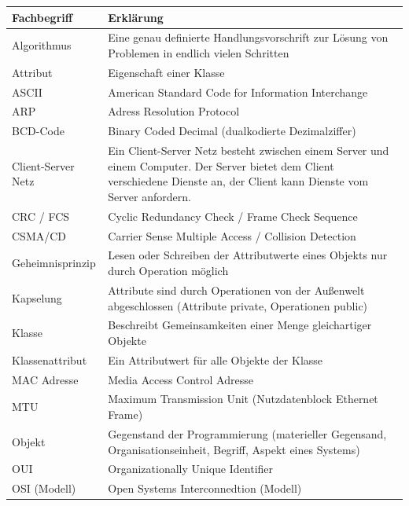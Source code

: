 \documentclass[12pt,a4paper]{article}
\begin{document}
    \begin{table}[h]
        \renewcommand{\arraystretch}{2}
        \begin{tabularx}{17cm}{|l|X|}
            \hline
            Fachbegriff&Erklärung\\
            \hline
            \hline
            Algorithmus&Eine genau definierte Handlungsvorschrift zur Lösung von Problemen in endlich vielen Schritten\\
            \hline
            Attribut&Eigenschaft einer Klasse\\
            \hline
            ASCII&American Standard Code for Information Interchange\\
            \hline
            ARP&Adress Resolution Protocol\\
            \hline
            BCD-Code&Binary Coded Decimal (dualkodierte Dezimalziffer)\\
            \hline
            Client-Server Netz&Ein Client-Server Netz besteht zwischen einem Server und einem Computer. Der Server bietet dem Client verschiedene Dienste an, der Client kann Dienste vom Server anfordern.\\
            \hline
            CRC / FCS& Cyclic Redundancy Check / Frame Check Sequence\\
            \hline
            CSMA/CD&Carrier Sense Multiple Access / Collision Detection\\
            \hline
            Geheimnisprinzip&Lesen oder Schreiben der Attributwerte eines Objekts nur durch Operation möglich\\
            \hline
            Kapselung&Attribute sind durch Operationen von der Außenwelt abgeschlossen (Attribute private, Operationen public)\\
            \hline
            Klasse&Beschreibt Gemeinsamkeiten einer Menge gleichartiger Objekte\\
            \hline
            Klassenattribut&Ein Attributwert für alle Objekte der Klasse\\
            \hline
            MAC Adresse& Media Access Control Adresse\\
            \hline
            MTU&Maximum Transmission Unit (Nutzdatenblock Ethernet Frame)\\
            \hline
            Objekt&Gegenstand der Programmierung (materieller Gegensand, Organisationseinheit, Begriff, Aspekt eines Systems)\\
            \hline
            OUI&Organizationally Unique Identifier\\
            \hline
            OSI (Modell)&Open Systems Interconnedtion (Modell)\\
            \hline
        \end{tabularx}
    \end{table}
\end{document}
